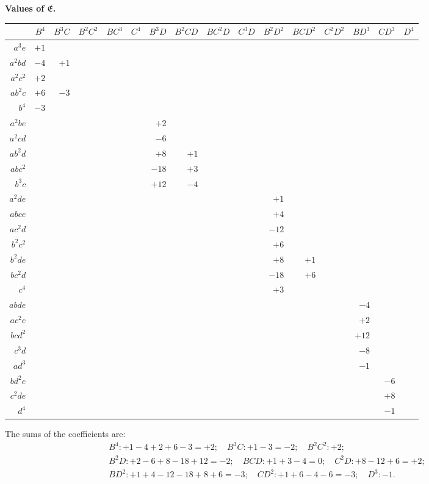 \documentclass[11pt,a4paper]{article}
\theoremstyle{definition}
\begin{document}
\begin{center}
\renewcommand{\arraystretch}{1.2}
\textbf{Values of $\mathfrak{E}$.}
\begin{tabular}{r|rrrrrrrrrrrrrrr}
& $B^{4}$ & $B^{3}C$ & $B^{2}C^{2}$ & $BC^{3}$ & $C^{4}$ & $B^{3}D$ & $B^{2}CD$ & $BC^{2}D$ & $C^{3}D$ & $B^{2}D^{2}$ & $BCD^{2}$ & $C^{2}D^{2}$ & $BD^{3}$ & $CD^{3}$ & $D^{4}$ \\
\hline
$a^{3}e$ & $+1$ \\
$a^{2}bd$ & $-4$ & $+1$ \\
$a^{2}c^{2}$ & $+2$ \\
$ab^{2}c$ & $+6$ & $-3$ \\
$b^{4}$ & $-3$ \\
$a^{2}be$ & & & & & & $+2$ \\
$a^{2}cd$ & & & & & & $-6$ \\
$ab^{2}d$ & & & & & & $+8$ & $+1$ \\
$abc^{2}$ & & & & & & $-18$ & $+3$ \\
$b^{3}c$ & & & & & & $+12$ & $-4$ \\
$a^{2}de$ & & & & & & & & & & $+1$ \\
$abce$ & & & & & & & & & & $+4$ \\
$ac^{2}d$ & & & & & & & & & & $-12$ \\
$b^{2}c^{2}$ & & & & & & & & & & $+6$ \\
$b^{2}de$ & & & & & & & & & & $+8$ & $+1$ \\
$bc^{2}d$ & & & & & & & & & & $-18$ & $+6$ \\
$c^{4}$ & & & & & & & & & & $+3$ \\
$abde$ & & & & & & & & & & & & & $-4$ \\
$ac^{2}e$ & & & & & & & & & & & & & $+2$ \\
$bcd^{2}$ & & & & & & & & & & & & & $+12$ \\
$c^{3}d$ & & & & & & & & & & & & & $-8$ \\
$ad^{3}$ & & & & & & & & & & & & & $-1$ \\
$bd^{2}e$ & & & & & & & & & & & & & & $-6$ \\
$c^{2}de$ & & & & & & & & & & & & & & $+8$ \\
$d^{4}$ & & & & & & & & & & & & & & $-1$
\end{tabular}
\end{center}

The sums of the coefficients are:
\begin{gather*}
B^{4}: +1-4+2+6-3=+2; \quad B^{3}C: +1-3=-2; \quad B^{2}C^{2}: +2; \\
B^{2}D: +2-6+8-18+12=-2; \quad BCD: +1+3-4=0; \quad C^{2}D: +8-12+6=+2; \\
BD^{2}: +1+4-12-18+8+6=-3; \quad CD^{2}: +1+6-4-6=-3; \quad D^{3}: -1.
\end{gather*}
\end{document}
